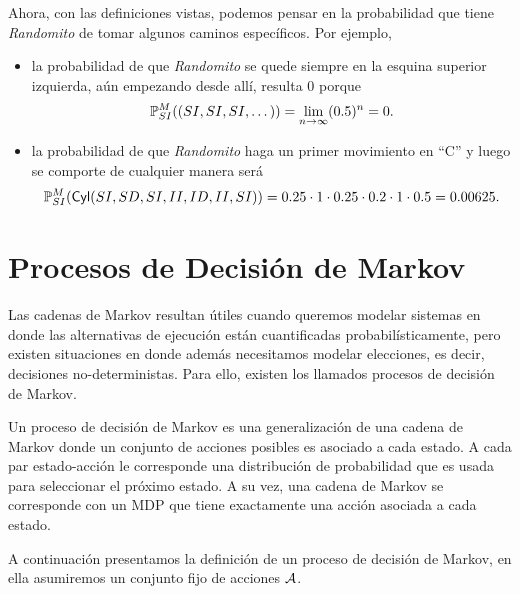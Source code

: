 Ahora, con las definiciones vistas, podemos pensar en la probabilidad que tiene
\emph{Randomito} de tomar algunos caminos específicos. Por ejemplo,
\begin{itemize}
	\item la probabilidad de que \emph{Randomito} se quede siempre en la esquina superior
	      izquierda, aún empezando desde allí, resulta 0 porque $$\mathbb{P}^M_{SI}((SI, SI,
		      SI, \dots)) = \lim_{n\to \infty} (0.5)^n = 0.$$
	\item la probabilidad de que \emph{Randomito} haga un primer movimiento en ``C'' y
	      luego se comporte de cualquier manera será $$\mathbb{P}^M_{SI}(\textsf{Cyl}(SI, SD, SI, II,
		      ID, II, SI)) = 0.25 \cdot 1 \cdot 0.25 \cdot 0.2 \cdot 1 \cdot 0.5 = 0.00625.$$
\end{itemize}



\section{Procesos de Decisión de Markov}

Las cadenas de Markov resultan útiles cuando queremos modelar sistemas en donde
las alternativas de ejecución están cuantificadas probabilísticamente, pero
existen situaciones en donde además necesitamos modelar elecciones, es decir,
decisiones no-deterministas. Para ello, existen los llamados procesos de
decisión de Markov.

Un proceso de decisión de Markov es una generalización de una cadena de Markov
donde un conjunto de acciones posibles es asociado a cada estado. A cada par
estado-acción le corresponde una distribución de probabilidad que es usada para
seleccionar el próximo estado. A su vez, una cadena de Markov se corresponde
con un MDP que tiene exactamente una acción asociada a cada estado.

A continuación presentamos la definición de un proceso de decisión de Markov,
en ella asumiremos un conjunto fijo de acciones $\mathcal{A}$.


